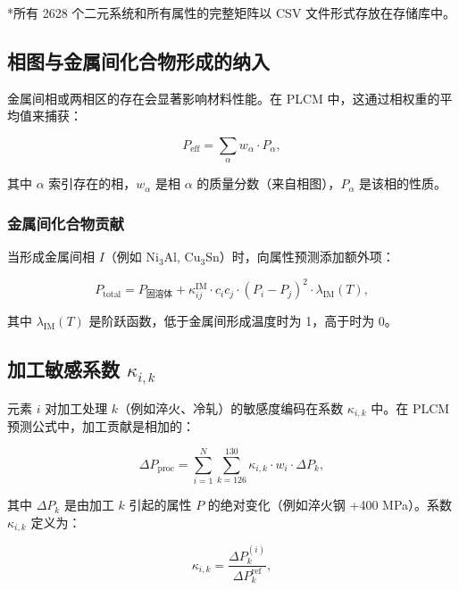 \documentclass[12pt,a4paper]{article}
\begin{document}
	*所有 2628 个二元系统和所有属性的完整矩阵以 CSV 文件形式存放在存储库中。
	
	\subsection{相图与金属间化合物形成的纳入}
	\label{subsec:phase-diagrams}
	
	金属间相或两相区的存在会显著影响材料性能。在 PLCM 中，这通过相权重的平均值来捕获：
	
	\begin{equation}
		P_{\text{eff}} = \sum_{\alpha} w_{\alpha} \cdot P_{\alpha},
		\label{eq:phase-weighted}
	\end{equation}
	
	其中 \(\alpha\) 索引存在的相，\(w_{\alpha}\) 是相 \(\alpha\) 的质量分数（来自相图），\(P_{\alpha}\) 是该相的性质。
	
	\subsubsection{金属间化合物贡献}
	当形成金属间相 \(I\)（例如 Ni\(_3\)Al, Cu\(_3\)Sn）时，向属性预测添加额外项：
	
	\begin{equation}
		P_{\text{total}} = P_{\text{固溶体}} + \kappa_{ij}^{\text{IM}} \cdot c_i c_j \cdot (P_i - P_j)^2 \cdot \lambda_{\text{IM}}(T),
		\label{eq:intermetallic-term}
	\end{equation}
	
	其中 \(\lambda_{\text{IM}}(T)\) 是阶跃函数，低于金属间形成温度时为 1，高于时为 0。
	
	\subsection{加工敏感系数 \(\kappa_{i,k}\)}
	\label{subsec:processing-coefficients}
	
	元素 \(i\) 对加工处理 \(k\)（例如淬火、冷轧）的敏感度编码在系数 \(\kappa_{i,k}\) 中。在 PLCM 预测公式中，加工贡献是相加的：
	
	\begin{equation}
		\Delta P_{\text{proc}} = \sum_{i=1}^{N} \sum_{k=126}^{130} \kappa_{i,k} \cdot w_i \cdot \Delta P_k,
		\label{eq:proc-contribution}
	\end{equation}
	
	其中 \(\Delta P_k\) 是由加工 \(k\) 引起的属性 \(P\) 的绝对变化（例如淬火钢 +400 MPa）。系数 \(\kappa_{i,k}\) 定义为：
	
	\begin{equation}
		\kappa_{i,k} = \frac{\Delta P_k^{(i)}}{\Delta P_k^{\text{ref}}},
		\label{eq:kappa-proc-def}
	\end{equation}
	
\end{document}
